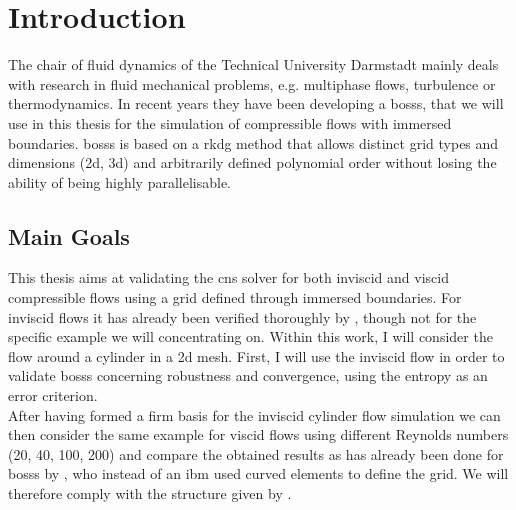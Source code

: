 \chapter{Introduction}
The chair of fluid dynamics of the Technical University Darmstadt mainly deals with research in fluid mechanical problems, e.g. multiphase flows, turbulence or thermodynamics. In recent years they have been developing a \gls{bosss}, that we will use in this thesis for the simulation of compressible flows with immersed boundaries. \gls{bosss} is based on a \gls{rkdg} method that allows  distinct grid types and dimensions (\gls{2d}, \gls{3d}) and arbitrarily defined polynomial order without losing the ability of being highly parallelisable. 

\section{Main Goals}

This thesis aims at validating the \gls{cns} solver for both inviscid and viscid compressible flows using a grid defined through immersed boundaries. For inviscid flows it has already been verified thoroughly by \cite{mueller2014}, though not for the specific example we will concentrating on. 
Within this work, I will consider the flow around a cylinder in a \gls{2d} mesh. First, I will use the inviscid flow in order to validate \gls{bosss} concerning robustness and convergence, using the entropy as an error criterion. \\ \indent
After having formed a firm basis for the inviscid cylinder flow simulation we can then consider the same example for viscid flows using different Reynolds numbers (20, 40, 100, 200) and compare the obtained results as has already been done for \gls{bosss} by \cite{ayers}, who instead of an \gls{ibm} used curved elements to define the grid. We will therefore comply with the structure given by \cite{ayers}.


